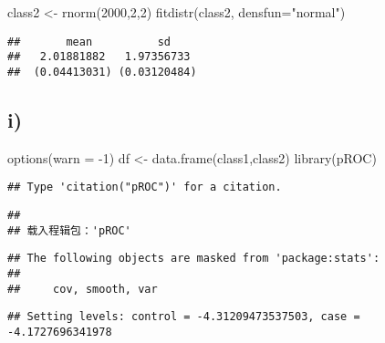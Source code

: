 \documentclass[
]{article}
\newenvironment{Shaded}{\begin{snugshade}}{\end{snugshade}}
\newcommand{\AttributeTok}[1]{\textcolor[rgb]{0.77,0.63,0.00}{#1}}
\newcommand{\ConstantTok}[1]{\textcolor[rgb]{0.00,0.00,0.00}{#1}}
\newcommand{\DecValTok}[1]{\textcolor[rgb]{0.00,0.00,0.81}{#1}}
\newcommand{\FunctionTok}[1]{\textcolor[rgb]{0.00,0.00,0.00}{#1}}
\newcommand{\NormalTok}[1]{#1}
\newcommand{\OtherTok}[1]{\textcolor[rgb]{0.56,0.35,0.01}{#1}}
\newcommand{\SpecialCharTok}[1]{\textcolor[rgb]{0.00,0.00,0.00}{#1}}
\newcommand{\StringTok}[1]{\textcolor[rgb]{0.31,0.60,0.02}{#1}}
\begin{document}
\begin{Shaded}
\begin{Highlighting}[]
\NormalTok{class2 }\OtherTok{\textless{}{-}} \FunctionTok{rnorm}\NormalTok{(}\DecValTok{2000}\NormalTok{,}\DecValTok{2}\NormalTok{,}\DecValTok{2}\NormalTok{)}
\FunctionTok{fitdistr}\NormalTok{(class2, }\AttributeTok{densfun=}\StringTok{"normal"}\NormalTok{)}
\end{Highlighting}
\end{Shaded}

\begin{verbatim}
##       mean          sd    
##   2.01881882   1.97356733 
##  (0.04413031) (0.03120484)
\end{verbatim}

\hypertarget{i-1}{%
\subsection{i)}\label{i-1}}

\begin{Shaded}
\begin{Highlighting}[]
\FunctionTok{options}\NormalTok{(}\AttributeTok{warn =} \SpecialCharTok{{-}}\DecValTok{1}\NormalTok{)}
\NormalTok{df }\OtherTok{\textless{}{-}} \FunctionTok{data.frame}\NormalTok{(class1,class2)}
\FunctionTok{library}\NormalTok{(pROC)}
\end{Highlighting}
\end{Shaded}

\begin{verbatim}
## Type 'citation("pROC")' for a citation.
\end{verbatim}

\begin{verbatim}
## 
## 载入程辑包：'pROC'
\end{verbatim}

\begin{verbatim}
## The following objects are masked from 'package:stats':
## 
##     cov, smooth, var
\end{verbatim}

\begin{Shaded}
\end{Shaded}

\begin{verbatim}
## Setting levels: control = -4.31209473537503, case = -4.1727696341978
\end{verbatim}
\end{document}
